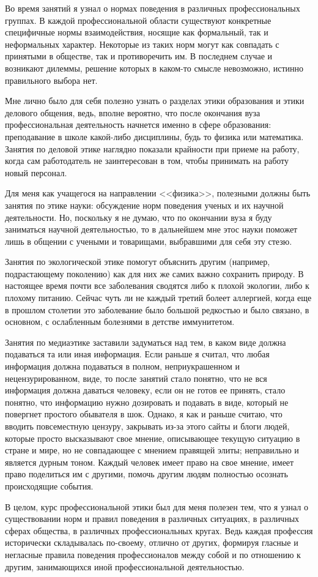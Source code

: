 \documentclass[14pt,pscyr]{hedwork}
\begin{document}
  Во время занятий я узнал о нормах поведения в различных профессиональных
  группах. В каждой профессиональной области существуют конкретные специфичные
  нормы взаимодействия, носящие как формальный, так и неформальных характер.
  Некоторые из таких норм могут как совпадать с принятыми в обществе, так и
  противоречить им. В последнем случае и возникают дилеммы, решение которых в
  каком-то смысле невозможно, истинно правильного выбора нет.
  
  Мне лично было для себя полезно узнать о разделах этики образования и этики
  делового общения, ведь, вполне вероятно, что после окончания вуза
  профессиональная деятельность начнется именно в сфере образования:
  преподавание в школе какой-либо дисциплины, будь то физика или математика.
  Занятия по деловой этике наглядно показали крайности при приеме на работу,
  когда сам работодатель не заинтересован в том, чтобы принимать на работу
  новый персонал.
  
  Для меня как учащегося на направлении <<физика>>, полезными должны быть
  занятия по этике науки: обсуждение норм поведения ученых и их научной
  деятельности. Но, поскольку я не думаю, что по окончании вуза я буду
  заниматься научной деятельностью, то в дальнейшем мне этос науки поможет
  лишь в общении с учеными и товарищами, выбравшими для себя эту стезю.
  
  Занятия по экологической этике помогут объяснить другим (например,
  подрастающему поколению) как для них же самих важно сохранить природу. В
  настоящее время почти все заболевания сводятся либо к плохой экологии, либо
  к плохому питанию. Сейчас чуть ли не каждый третий болеет аллергией, когда
  еще в прошлом столетии это заболевание было большой редкостью и было связано,
  в основном, с ослабленным болезнями в детстве иммунитетом.
  
  Занятия по медиаэтике заставили задуматься над тем, в каком виде должна
  подаваться та или иная информация. Если раньше я считал, что любая информация
  должна подаваться в полном, неприукрашенном и нецензурированном, виде, то
  после занятий стало понятно, что не вся информация должна даваться человеку,
  если он не готов ее принять, стало понятно, что информацию нужно дозировать и
  подавать в виде, который не повергнет простого обывателя в шок. Однако, я как
  и раньше считаю, что вводить повсеместную цензуру, закрывать из-за этого
  сайты и блоги людей, которые просто высказывают свое мнение, описывающее
  текущую ситуацию в стране и мире, но не совпадающее с мнением правящей элиты;
  неправильно и является дурным тоном. Каждый человек имеет право на свое
  мнение, имеет право поделиться им с другими, помочь другим людям полностью
  осознать происходящие события.
  
  В целом, курс профессиональной этики был для меня полезен тем, что я узнал о
  существовании норм и правил поведения в различных ситуациях, в различных
  сферах общества, в различных профессиональных кругах. Ведь каждая профессия
  исторически складывалась по-своему, отлично от других, формируя гласные и
  негласные правила поведения профессионалов между собой и по отношению к
  другим, занимающихся иной профессиональной деятельностью.
\end{document}
